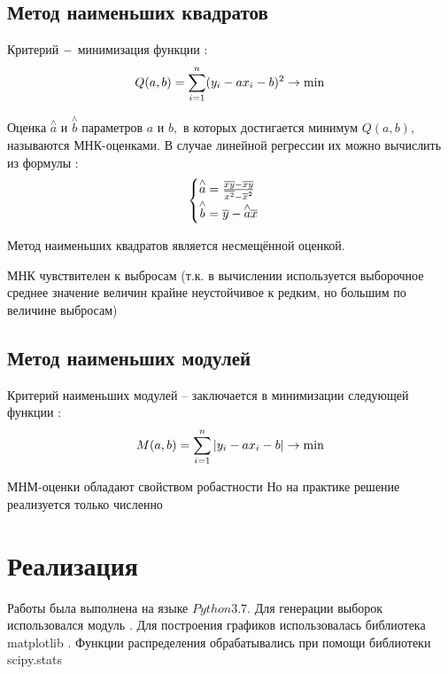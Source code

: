 \documentclass[12pt]{article}
\begin{document}
\subsection{Метод наименьших квадратов}

Критерий $\--$ минимизация функции \cite{MNK}:
\begin{equation}
    Q(a,b)=\sum\limits_{i=1}^n(y_i-ax_i-b)^2\to \min\hfill
\end{equation}

Оценка $\overset{\wedge}{a}$ и $\overset{\wedge}{b}$ параметров $a$ и $b,$ в которых достигается минимум $Q(a,b),$ называются МНК-оценками. В случае линейной регрессии их можно вычислить из формулы \cite{6_3}:
\begin{equation}
    \begin{cases}
    \overset{\wedge}{a} = \frac{\overline{x y}-\overline{x}\overline{y}}{\overline{x^2}-\overline{x}^2}\\
    \overset{\wedge}{b} = \overline{y}-\overset{\wedge}{a}\overline{x}
    \end{cases}\hfill
\end{equation}

Метод наименьших квадратов является несмещённой оценкой.

МНК чувствителен к выбросам (т.к. в вычислении используется выборочное среднее значение величин крайне неустойчивое к редким, но большим по величине выбросам)

\subsection{Метод наименьших модулей}
Критерий наименьших модулей – заключается в минимизации следующей функции \cite{6_4}:
\begin{equation}
    M(a,b) = \sum\limits_{i=1}^n\vert y_i-ax_i-b\vert\to\min\hfill
\end{equation}

МНМ-оценки обладают свойством робастности
Но на практике решение реализуется только численно

\section{Реализация}

Работы была выполнена на языке $Python 3.7.$
Для генерации выборок использовался модуль \cite{numpy}.
Для построения графиков использовалась библиотека matplotlib \cite{plotlib}.
Функции распределения обрабатывались при помощи библиотеки scipy.stats \cite{skp}
\end{document}
